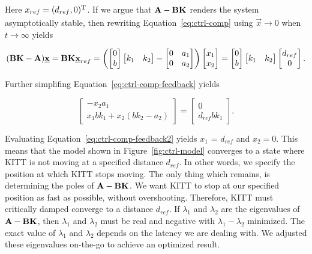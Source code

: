 \documentclass[11pt,titlepage]{report}
\begin{document}
Here $x_{ref}=(d_{ref},0)^{\text T}$. If we argue that $\mathbf{A} - \mathbf{B} \mathbf{K}$ renders the system asymptotically stable, then rewriting Equation~\ref{eq:ctrl-comp} using $\dot{\vec{x}} \to 0$ when $t \to \infty$ yields

\begin{equation} \label{eq:ctrl-comp-feedback}
	(\mathbf{B} \mathbf{K} - \mathbf{A}) \mathbf{\underline{x}} = \mathbf{B} \mathbf{K} \mathbf{\underline{x}}_{ref} = 
	\left( \begin{bmatrix}
		0 \\
		b
	\end{bmatrix} \begin{bmatrix}
		k_1 & k_2
	\end{bmatrix} - \begin{bmatrix}
		0 & a_1 \\
		0 & a_2
	\end{bmatrix} \right) \begin{bmatrix}
		x_1 \\
		x_2
	\end{bmatrix} = \begin{bmatrix}
		0 \\
		b
	\end{bmatrix} \begin{bmatrix}
		k_1 & k_2
	\end{bmatrix} \begin{bmatrix}
		d_{ref} \\
		0
	\end{bmatrix}.
\end{equation}

Further simplifing Equation~\ref{eq:ctrl-comp-feedback} yields

\begin{equation} \label{eq:ctrl-comp-feedback2}
	\begin{bmatrix}
		 -x_2 a_1 \\
		x_1 b k_1 + x_2 (b k_2 - a_2)
	\end{bmatrix} = \begin{bmatrix}
		0 \\
		d_{ref} b k_1
	\end{bmatrix}.
\end{equation}

Evaluating Equation~\ref{eq:ctrl-comp-feedback2} yields $x_1$ = $d_{ref}$ and $x_2=0$. This means that the model shown in Figure~\ref{fig:ctrl-model} converges to a state where KITT is not moving at a specified distance $d_{ref}$. In other words, we specify the position at which KITT stops moving. The only thing which remains, is determining the poles of $\mathbf{A} - \mathbf{B} \mathbf{K}$. We want KITT to stop at our specified position as fast as possible, without overshooting. Therefore, KITT must critically damped converge to a distance $d_{ref}$. If $\lambda_1$ and $\lambda_2$ are the eigenvalues of $\mathbf{A} - \mathbf{B} \mathbf{K}$, then $\lambda_1$ and $\lambda_2$ must be real and negative with $\lambda_1 - \lambda_2$ minimized. The exact value of $\lambda_1$ and $\lambda_2$ depends on the latency we are dealing with. We adjusted these eigenvalues on-the-go to achieve an optimized result.
\end{document}

